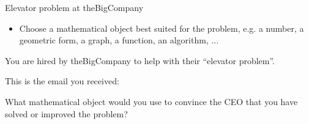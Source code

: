 \question
\label{elevator-define}
Elevator problem at theBigCompany



\begin{annotation}
	\begin{goals}
		\begin{itemize}
			\item Choose a mathematical object best suited for the problem, e.g. a number, a geometric form, a graph, a function, an algorithm, ...

		\end{itemize}
	\end{goals}
%		
%
\end{annotation}


You are hired by theBigCompany to help with their ``elevator problem''.

This is the email you received:

\begin{center}
\begin{minipage}{.75\textwidth}
	\email
\end{minipage}
\end{center}



What mathematical object would you use to convince the CEO that you have solved or improved the problem?

